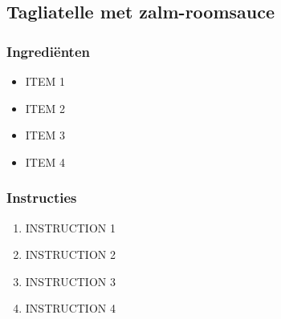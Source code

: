 \subsection{Tagliatelle met zalm-roomsauce}
\subsubsection*{Ingrediënten}
\begin{multicols}{2}
    \begin{itemize}
        \item ITEM 1
        \item ITEM 2
        \item ITEM 3
        \item ITEM 4
    \end{itemize}
\end{multicols}

\subsubsection*{Instructies}
\begin{multicols}{2}
    \begin{enumerate}
        \item INSTRUCTION 1
        \item INSTRUCTION 2
        \item INSTRUCTION 3
        \item INSTRUCTION 4
    \end{enumerate}
\end{multicols}
